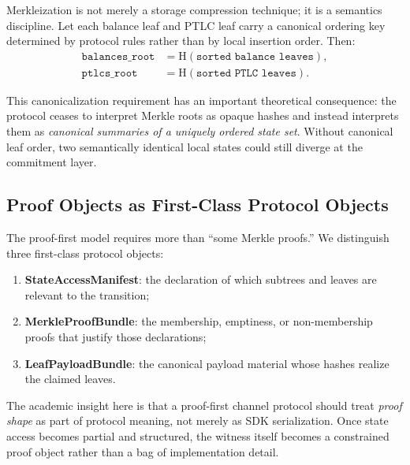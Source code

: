 \documentclass[11pt,a4paper]{article}
\newcommand{\Hash}{\mathrm{H}}
\begin{document}
Merkleization is not merely a storage compression technique; it is a semantics discipline. Let each balance leaf and PTLC leaf carry a canonical ordering key determined by protocol rules rather than by local insertion order. Then:
\begin{align*}
\texttt{balances\_root} &= \Hash(\texttt{sorted balance leaves}), \\
\texttt{ptlcs\_root} &= \Hash(\texttt{sorted PTLC leaves}).
\end{align*}

This canonicalization requirement has an important theoretical consequence: the protocol ceases to interpret Merkle roots as opaque hashes and instead interprets them as \emph{canonical summaries of a uniquely ordered state set}. Without canonical leaf order, two semantically identical local states could still diverge at the commitment layer.

\subsection{Proof Objects as First-Class Protocol Objects}

The proof-first model requires more than ``some Merkle proofs.'' We distinguish three first-class protocol objects:
\begin{enumerate}
    \item \textbf{StateAccessManifest}: the declaration of which subtrees and leaves are relevant to the transition;
    \item \textbf{MerkleProofBundle}: the membership, emptiness, or non-membership proofs that justify those declarations;
    \item \textbf{LeafPayloadBundle}: the canonical payload material whose hashes realize the claimed leaves.
\end{enumerate}

The academic insight here is that a proof-first channel protocol should treat \emph{proof shape} as part of protocol meaning, not merely as SDK serialization. Once state access becomes partial and structured, the witness itself becomes a constrained proof object rather than a bag of implementation detail.
\end{document}
